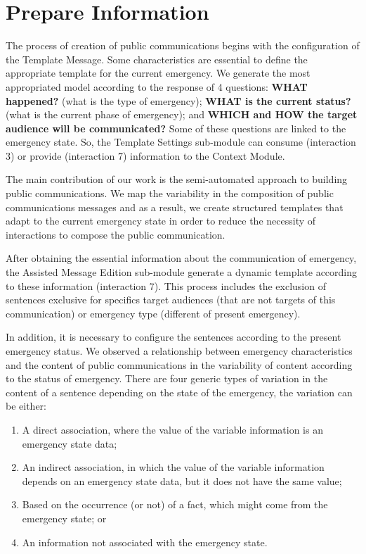 \section{Prepare Information}

The process of creation of public communications begins with the configuration of the Template Message. Some characteristics are essential to define the appropriate template for the current emergency. We generate the most appropriated model according to the response of 4 questions: \textbf{WHAT happened?} (what is the type of emergency); \textbf{WHAT is the current status?} (what is the current phase of emergency); and \textbf{WHICH and HOW the target audience will be communicated?} Some of these questions are linked to the emergency state. So, the Template Settings sub-module can consume (interaction 3) or provide (interaction 7) information to the Context Module. 

The main contribution of our work is the semi-automated approach to building public communications. We map the variability in the composition of public communications messages and as a result, we create structured templates that adapt to the current emergency state in order to reduce the necessity of interactions to compose the public communication.

After obtaining the essential information about the communication of emergency, the Assisted Message Edition sub-module generate a dynamic template according to these information (interaction 7). This process includes the exclusion of sentences exclusive for specifics target audiences (that are not targets of this communication) or emergency type (different of present emergency). %

In addition, it is necessary to configure the sentences according to the present emergency status. We observed a relationship between emergency characteristics and the content of public communications in the variability of content according to the status of emergency. There are four generic types of variation in the content of a sentence depending on the state of the emergency, the variation can be either: 

\begin{enumerate}
   \item A direct association, where the value of the variable information is an emergency state data;
   \item An indirect association, in which the value of the variable information depends on an emergency state data, but it does not have the same value;
   \item Based on the occurrence (or not) of a fact, which might come from the emergency state; or
   \item An information not associated with the emergency state.
\end{enumerate}


